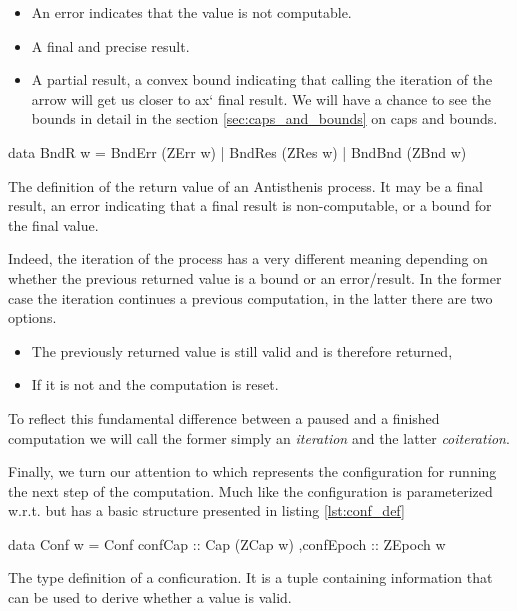 \begin{itemize}
\item An error indicates that the value is not computable.
\item A final and precise result.
\item A partial result, a convex bound indicating that calling the
  iteration of the arrow will get us closer to ax` final result. We will
  have a chance to see the bounds in detail in the section
  \ref{sec:caps_and_bounds} on caps and bounds.
\end{itemize}


\begin{code}
\begin{haskellcode}
data BndR w
  = BndErr (ZErr w)
  | BndRes (ZRes w)
  | BndBnd (ZBnd w)
\end{haskellcode}
  \caption{\label{lst:bnd_def}The definition of the return value of an
    Antisthenis process. It may be a final result, an error indicating
    that a final result is non-computable, or a bound for the final
    value.}
\end{code}

Indeed, the iteration of the process has a very different meaning
depending on whether the previous returned value is a bound or an
error/result. In the former case the iteration continues a previous
computation, in the latter there are two options.

\begin{itemize}
\item The previously returned value is still valid and is therefore
  returned,
\item If it is not and the computation is reset.
\end{itemize}

To reflect this fundamental difference between a paused and a finished
computation we will call the former simply an \emph{iteration} and the
latter \emph{coiteration}.

Finally, we turn our attention to  which represents the
configuration for running the next step of the computation. Much like
 the configuration is parameterized w.r.t.  but has
a basic structure presented in listing \ref{lst:conf_def}

\begin{code}
\begin{haskellcode}
data Conf w =
  Conf { confCap :: Cap (ZCap w)
        ,confEpoch :: ZEpoch w
       }
\end{haskellcode}
  \caption{\label{lst:conf_def}The type definition of a
    conficuration. It is a tuple containing information that can be
    used to derive whether a value is valid.}
\end{code}

